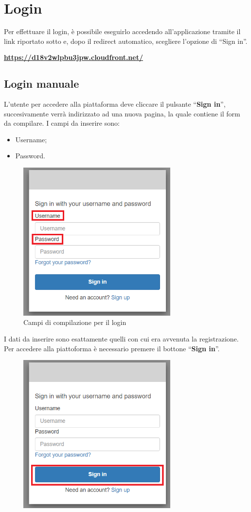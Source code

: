 \section{Login} {
    Per effettuare il login, è possibile eseguirlo accedendo all'applicazione tramite il link riportato sotto e, dopo il redirect automatico, scegliere l'opzione di ``Sign in''. 
    \begin{center}
        \textbf{\url{https://d18v2wlpbu3jpw.cloudfront.net/}}
    \end{center}
    \subsection{Login manuale} {
        L'utente per accedere alla piattaforma deve cliccare il pulsante ``\textbf{Sign in}'', succesivamente verrà indirizzato ad una nuova pagina, 
        la quale contiene il form da compilare. I campi da inserire sono: 
        \begin{itemize}
            \item Username;
            \item Password.
        \end{itemize}
        \begin{figure}[H]
            \includegraphics[width=8cm]{sezioni/images/form-log.png}
            \centering
            \caption{Campi di compilazione per il login}
        \end{figure}
        I dati da inserire sono esattamente quelli con cui era avvenuta la registrazione. \aCapo
        Per accedere alla piattoforma è necessario premere il bottone ``\textbf{Sign in}''. 
        \begin{figure}[H]
            \includegraphics[width=8cm]{sezioni/images/conf-log.png}

\end{figure}}}
